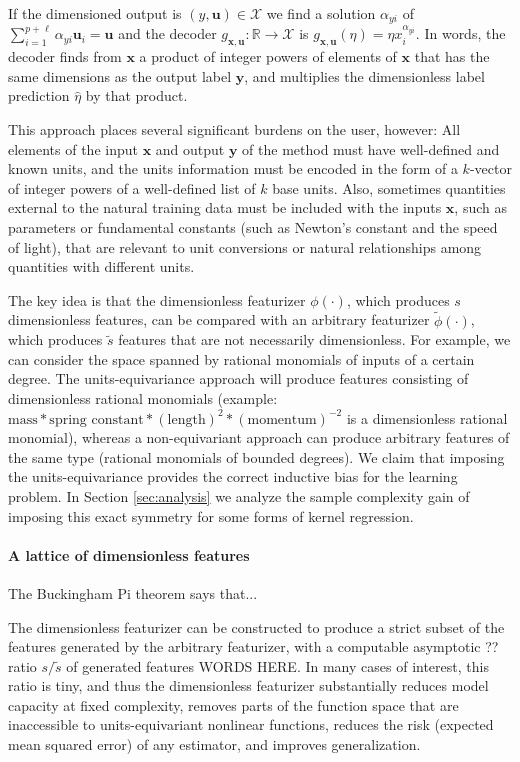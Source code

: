 \documentclass[nohyperref]{article}
\theoremstyle{plain}
\theoremstyle{definition}
\theoremstyle{remark}
\begin{document}
If the dimensioned output is $(y, \mathbf u) \in \mathcal X$ we find a solution $\alpha_{yi}$ of $\sum_{i=1}^{p+\ell} \alpha_{yi} \mathbf u_i =\mathbf u$ and the decoder $g_{\mathbf x, \mathbf u}:\mathbb R \to \mathcal X$ is $g_{\mathbf x, \mathbf u}(\eta) = \eta x_i^{\alpha_{yi}}$.
In words, the decoder finds from $\mathbf x$ a product of integer powers of elements of $\mathbf x$ that has the same dimensions as the output label $\mathbf y$, and multiplies the dimensionless label prediction $\hat{\eta}$ by that product.

This approach places several significant burdens on the user, however:
All elements of the input $\mathbf x$ and output $\mathbf y$ of the method must have well-defined and known units, and the units information must be encoded in the form of a $k$-vector of integer powers of a well-defined list of $k$ base units.
Also, sometimes quantities external to the natural training data must be included with the inputs $\mathbf x$, such as parameters or fundamental constants (such as Newton's constant and the speed of light), that are relevant to unit conversions or natural relationships among quantities with different units.

The key idea is that the dimensionless featurizer $\phi(\cdot)$, which produces $s$ dimensionless features, can be compared with an arbitrary featurizer $\tilde{\phi}(\cdot)$, which produces $\tilde{s}$ features that are not necessarily dimensionless. For example, we can consider the space spanned by rational monomials of inputs of a certain degree. The units-equivariance approach will produce features consisting of dimensionless rational monomials (example: $\text{mass}*\text{spring constant}*(\text{length})^2*(\text{momentum})^{-2}$ is a dimensionless rational monomial), whereas a non-equivariant approach can produce arbitrary features of the same type (rational monomials of bounded degrees). We claim that imposing the units-equivariance provides the correct inductive bias for the learning problem. In Section \ref{sec:analysis} we analyze the sample complexity gain of imposing this exact symmetry for some forms of kernel regression. 

\paragraph{A lattice of dimensionless features} The Buckingham Pi theorem says that... 

The dimensionless featurizer can be constructed to produce a strict subset of the features generated by the arbitrary featurizer, with a computable asymptotic ?? ratio $s/\tilde{s}$ of generated features WORDS HERE.
In many cases of interest, this ratio is tiny, and thus the dimensionless featurizer substantially reduces model capacity at fixed complexity, removes parts of the function space that are inaccessible to units-equivariant nonlinear functions, reduces the risk (expected mean squared error) of any estimator, and improves generalization.
\end{document}
